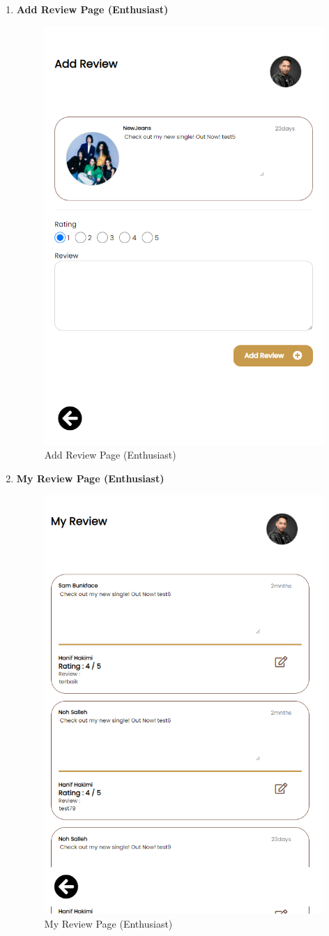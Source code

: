 \begin{enumerate}[1.]
    \item \textbf{Add Review Page (Enthusiast)}
    \begin{figure}[h]
        \centering
        \includegraphics[width=0.5\linewidth]{mainmatter/images/frontend/ss/Add Review (Enthusiast).png}
        \caption{Add Review Page (Enthusiast)}
        \label{fig:myfig67}
    \end{figure}

    \item \textbf{My Review Page (Enthusiast)}
    \begin{figure}[h]
        \centering
        \includegraphics[width=0.5\linewidth]{mainmatter/images/frontend/ss/My Review (Enthusiast).png}
        \caption{My Review Page (Enthusiast)}
        \label{fig:myfig68}
    \end{figure}


\end{enumerate}

